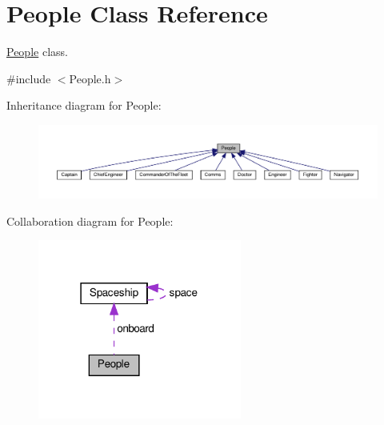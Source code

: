 \hypertarget{classPeople}{}\section{People Class Reference}
\label{classPeople}


\hyperlink{classPeople}{People} class.  




{\ttfamily \#include $<$People.\+h$>$}



Inheritance diagram for People\+:\nopagebreak
\begin{figure}[H]
\begin{center}
\leavevmode
\includegraphics[width=350pt]{classPeople__inherit__graph}
\end{center}
\end{figure}


Collaboration diagram for People\+:\nopagebreak
\begin{figure}[H]
\begin{center}
\leavevmode
\includegraphics[width=190pt]{classPeople__coll__graph}
\end{center}
\end{figure}
